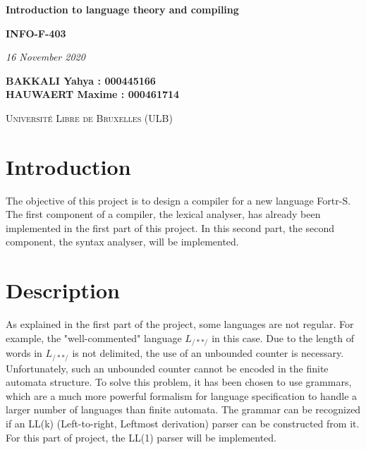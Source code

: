 \documentclass{article}
\begin{document}
\begin{titlepage}
    \begin{center}
        \vspace*{1cm}


        \Huge
        \textbf{Introduction to language theory and compiling}
        \vspace{0.25cm}

        \LARGE
        \textbf{INFO-F-403}

        \vspace{0.25cm}
        \LARGE

        \vspace{0.25cm}
        \textit{16 November 2020}

        \vspace{3cm}
           \Large
        \textbf{BAKKALI Yahya : 000445166 \\}
        \textbf{HAUWAERT Maxime : 000461714 \\}


        \vspace{2cm}

        \textsc{Université Libre de Bruxelles (ULB)}


    \end{center}
\end{titlepage}

\tableofcontents
\newpage
\section{Introduction}
The objective of this project is to design a compiler for a new language Fortr-S. The first component of a compiler, the lexical analyser, has already been implemented in the first part of this project. In this second part, the second component, the syntax analyser, will be implemented.

\section{Description}
As explained in the first part of the project, some languages are not regular. For example, the "well-commented" language $L_{/**/}$ in this case.
Due to the length of words in $L_{/**/}$ is not delimited, the use of an unbounded counter is necessary. Unfortunately, such an unbounded counter cannot be encoded in the finite automata structure. To solve this problem, it has been chosen to use grammars, which are a much more powerful formalism for language specification to handle a larger number of languages than finite automata. The grammar can be recognized if an LL(k) (Left-to-right, Leftmost derivation) parser can be constructed from it. For this part of project, the LL(1) parser will be implemented.\\
\end{document}
